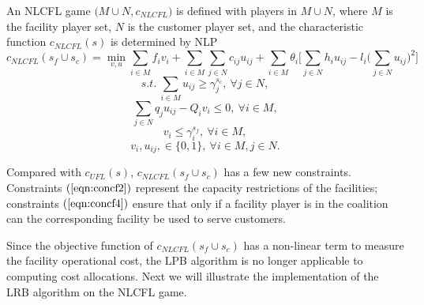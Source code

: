 \documentclass[ijoc,nonblindrev]{informs3} %
\begin{document}
\begin{definition}
An NLCFL game $\big( M \cup N,c_{NLCFL} \big)$ is defined with players in $M \cup N$, where $M$ is the facility player set, $N$  is the customer player set, and the characteristic function $c_{NLCFL}(s)$ is determined by NLP
\begin{equation}\label{eqn:cfobjnonlinear}
c_{NLCFL}(s_f \cup s_c) = \min_{v,u}  \sum_{i \in M} f_iv_i + \sum_{i \in M}\sum_{j \in N} c_{ij}u_{ij} + \sum_{i \in M} \theta_i \big[ \sum_{j \in N}h_iu_{ij} - l_i \big(\sum_{j \in N}u_{ij}\big)^2 \big]
\end{equation}
\begin{equation}\label{eqn:concf1}
s.t.~\sum_{i \in M} u_{ij} \geq \gamma_j^{s_c},~\forall j \in N,
\end{equation}
\begin{equation}\label{eqn:concf2}
\sum_{j \in N}q_ju_{ij} - Q_iv_i \leq 0, ~\forall i \in M,
\end{equation}
\begin{equation}\label{eqn:concf4}
v_i \leq \gamma_i^{s_f},~\forall i \in M,
\end{equation}
\begin{equation}\label{eqn:concf7}
 v_i,u_{ij}, \in \big\{0,1\big\},~\forall i \in M, j \in N.
\end{equation}
\end{definition} 
Compared with $c_{UFL}(s)$, $c_{NLCFL}(s_f \cup s_c)$ has a few new constraints. 
Constraints $(\ref{eqn:concf2})$ represent the capacity restrictions of the facilities; constraints $(\ref{eqn:concf4})$ ensure that only if a facility player is in the coalition can the corresponding facility be used to serve customers.


Since the objective function of $c_{NLCFL}(s_f \cup s_c)$ has a non-linear term to measure the facility operational cost, the LPB algorithm is no longer applicable to computing cost allocations. Next we will illustrate the implementation of the LRB algorithm on the NLCFL game.
\end{document}
